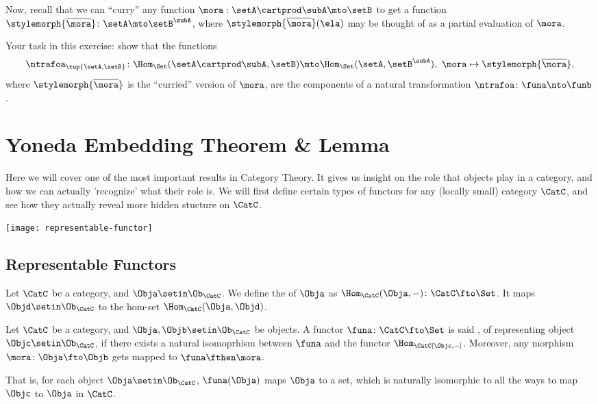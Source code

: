 \begin{gradedexercise}
    Now, recall that we can ``curry'' any function $\mora : \setA \cartprod \subA \mto \setB$ to get a function $\stylemorph{\overline{{\mora}}} \colon \setA \mto \setB^\subA$, where $\stylemorph{\overline{{\mora}}}(\ela)$ may be thought of as a partial evaluation of $\mora$.

    Your task in this exercise: show that the functions
    \begin{equation}
        \ntrafoa_{\tup{\setA, \setB}} \colon \Hom_\Set(\setA \cartprod \subA, \setB) \mto \Hom_\Set(\setA, \setB^\subA), \ \mora \mapsto \stylemorph{\overline{{\mora}}},
    \end{equation}
    where $\stylemorph{\overline{{\mora}}}$ is the ``curried'' version of $\mora$, are the components of a natural transformation $\ntrafoa \colon \funa \nto \funb$.
\end{gradedexercise}


\section{Yoneda Embedding Theorem \& Lemma}
Here we will cover one of the most important results in Category Theory. It gives us insight on the role that objects play 
in a category, and how we can actually 'recognize' what their role is. We will first define certain types of functors for any (locally small) category $\CatC$, and see how they actually reveal more hidden stucture on $\CatC$.

\begin{marginfigure}
\centering
\texttt{[image: representable-functor]}
\label{fig:representable-functor}
\end{marginfigure}

\subsection{Representable Functors}
\begin{ctdefinition}
Let $\CatC$ be a category, and $\Obja \setin \Ob_\CatC$. We define the  of $\Obja$ as $\Hom_\CatC(\Obja, -)\colon\CatC\fto\Set$. It maps $\Objd \setin \Ob_\CatC$ to the hom-set $\Hom_\CatC(\Obja, \Objd)$.
\end{ctdefinition}

\begin{ctdefinition}
Let $\CatC$ be a category, and $\Obja, \Objb \setin \Ob_\CatC$ be objects. A functor $\funa\colon\CatC \fto \Set$ is said , of representing object $\Objc\setin\Ob_\CatC$, if there exists a natural isomoprhism between $\funa$ and the functor $\Hom_\CatC[\Objc, -]$. Moreover, any morphism $\mora\colon\Obja\fto\Objb$ gets mapped to $\funa\fthen\mora$.

That is, for each object $\Obja \setin \Ob_\CatC$, $\funa(\Obja)$ maps $\Obja$ to a set, which is naturally isomorphic to all the ways to map $\Objc$ to $\Obja$ in $\CatC$.
\end{ctdefinition}

